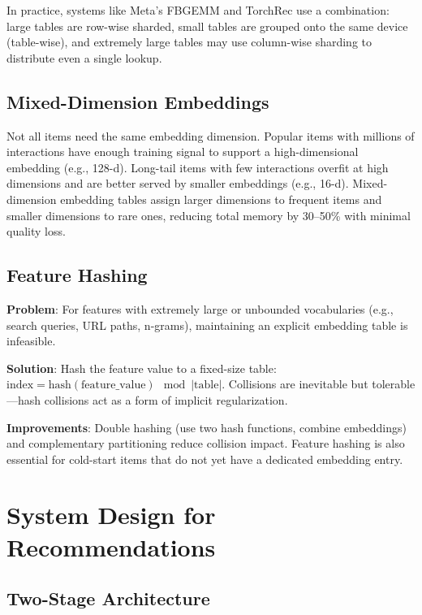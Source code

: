 In practice, systems like Meta's FBGEMM and TorchRec use a combination: large tables are row-wise sharded, small tables are grouped onto the same device (table-wise), and extremely large tables may use column-wise sharding to distribute even a single lookup.

\subsection{Mixed-Dimension Embeddings}

Not all items need the same embedding dimension. Popular items with millions of interactions have enough training signal to support a high-dimensional embedding (e.g., 128-d). Long-tail items with few interactions overfit at high dimensions and are better served by smaller embeddings (e.g., 16-d). Mixed-dimension embedding tables assign larger dimensions to frequent items and smaller dimensions to rare ones, reducing total memory by 30--50\% with minimal quality loss.

\subsection{Feature Hashing}

\textbf{Problem}: For features with extremely large or unbounded vocabularies (e.g., search queries, URL paths, n-grams), maintaining an explicit embedding table is infeasible.

\textbf{Solution}: Hash the feature value to a fixed-size table: $\text{index} = \text{hash}(\text{feature\_value}) \mod |\text{table}|$. Collisions are inevitable but tolerable---hash collisions act as a form of implicit regularization.

\textbf{Improvements}: Double hashing (use two hash functions, combine embeddings) and complementary partitioning reduce collision impact. Feature hashing is also essential for cold-start items that do not yet have a dedicated embedding entry.

\section{System Design for Recommendations}
\label{sec:recsys_system}

\subsection{Two-Stage Architecture}

